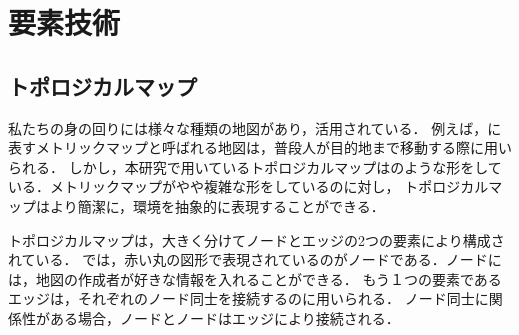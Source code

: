 \documentclass[../main]{subfiles}
\begin{document}
\setcounter{secnumdepth}{4}
    \chapter{要素技術}
        \section{トポロジカルマップ}
        私たちの身の回りには様々な種類の地図があり，活用されている．
        例えば，に表すメトリックマップと呼ばれる地図は，普段人が目的地まで移動する際に用いられる．
        しかし，本研究で用いているトポロジカルマップはのような形をしている．メトリックマップがやや複雑な形をしているのに対し，
        トポロジカルマップはより簡潔に，環境を抽象的に表現することができる．


        トポロジカルマップは，大きく分けてノードとエッジの2つの要素により構成されている．
        では，赤い丸の図形で表現されているのがノードである．ノードには，地図の作成者が好きな情報を入れることができる．
        もう１つの要素であるエッジは，それぞれのノード同士を接続するのに用いられる．
        ノード同士に関係性がある場合，ノードとノードはエッジにより接続される．

\end{document}
